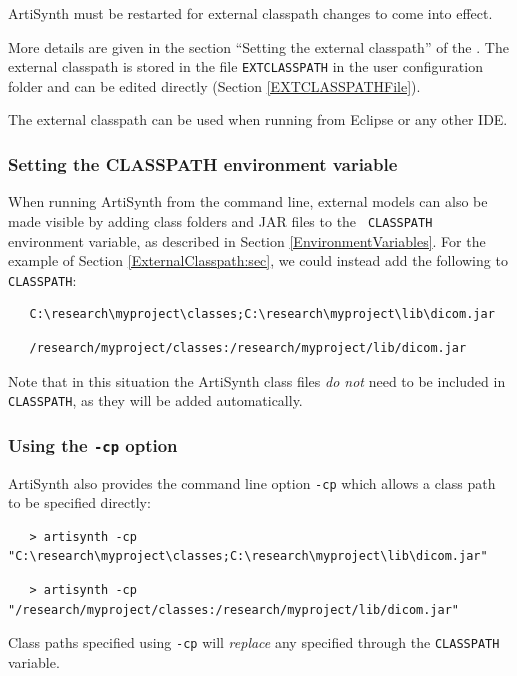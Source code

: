 \begin{sideblock}
ArtiSynth must be restarted for external classpath changes to come
into effect.
\end{sideblock}

More details are given in the section ``Setting the external classpath''
of the 
.
The external classpath is stored in the file {\tt EXTCLASSPATH}
in the user configuration folder and can be edited directly
(Section \ref{EXTCLASSPATHFile}).

The external classpath can be used when running from Eclipse or any
other IDE.

\subsubsection{Setting the CLASSPATH environment variable}
\label{SettingCLASSPATH}

When running ArtiSynth from the command line, external models can also
be made visible by adding class folders and JAR files to the {\tt
CLASSPATH} environment variable, as described in
Section \ref{EnvironmentVariables}. For the example of
Section \ref{ExternalClasspath:sec}, we could instead add the following to
{\tt CLASSPATH}:
\ifWindows
\begin{verbatim}
   C:\research\myproject\classes;C:\research\myproject\lib\dicom.jar
\end{verbatim}
\else
\begin{verbatim}
   /research/myproject/classes:/research/myproject/lib/dicom.jar
\end{verbatim}
\fi
Note that in this situation the ArtiSynth class files {\it do not}
need to be included in {\tt CLASSPATH}, as they will be added
automatically.

\subsubsection{Using the {\tt -cp} option}

ArtiSynth also provides the command line option {\tt -cp} which allows
a class path to be specified directly:
\ifWindows
\begin{verbatim}
   > artisynth -cp "C:\research\myproject\classes;C:\research\myproject\lib\dicom.jar"
\end{verbatim}
\else
\begin{verbatim}
   > artisynth -cp "/research/myproject/classes:/research/myproject/lib/dicom.jar"
\end{verbatim}
\fi
Class paths specified using {\tt -cp} will {\it replace} any specified
through the {\tt CLASSPATH} variable.

